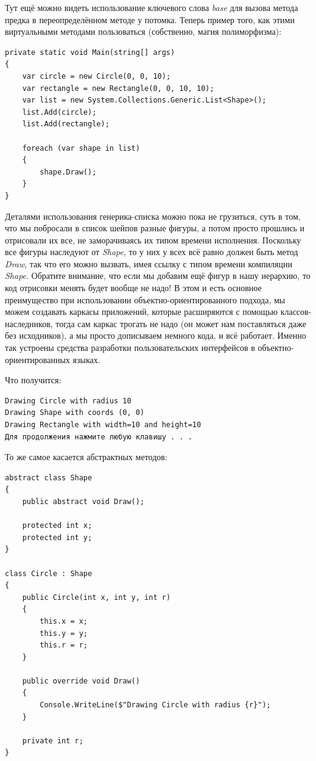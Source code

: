 \documentclass[a5paper]{article}
\begin{document}
Тут ещё можно видеть использование ключевого слова \textit{base} для вызова метода предка в переопределённом методе у потомка. Теперь пример того, как этими виртуальными методами пользоваться (собственно, магия полиморфизма):

\begin{verbatim}
private static void Main(string[] args)
{
    var circle = new Circle(0, 0, 10);
    var rectangle = new Rectangle(0, 0, 10, 10);
    var list = new System.Collections.Generic.List<Shape>();
    list.Add(circle);
    list.Add(rectangle);

    foreach (var shape in list)
    {
        shape.Draw();
    }
}
\end{verbatim}

Деталями использования генерика-списка можно пока не грузиться, суть в том, что мы побросали в список шейпов разные фигуры, а потом просто прошлись и отрисовали их все, не заморачиваясь их типом времени исполнения. Поскольку все фигуры наследуют от \textit{Shape}, то у них у всех всё равно должен быть метод \textit{Draw}, так что его можно вызвать, имея ссылку с типом времени компиляции \textit{Shape}. Обратите внимание, что если мы добавим ещё фигур в нашу иерархию, то код отрисовки менять будет вообще не надо! В этом и есть основное преимущество при использовании объектно-ориентированного подхода, мы можем создавать каркасы приложений, которые расширяются с помощью классов-наследников, тогда сам каркас трогать не надо (он может нам поставляться даже без исходников), а мы просто дописываем немного кода, и всё работает. Именно так устроены средства разработки пользовательских интерфейсов в объектно-ориентированных языках.

Что получится:

\begin{verbatim}
Drawing Circle with radius 10
Drawing Shape with coords (0, 0)
Drawing Rectangle with width=10 and height=10
Для продолжения нажмите любую клавишу . . .
\end{verbatim}

То же самое касается абстрактных методов:

\begin{verbatim}
abstract class Shape
{
    public abstract void Draw();

    protected int x;
    protected int y;
}

class Circle : Shape
{
    public Circle(int x, int y, int r)
    {
        this.x = x;
        this.y = y;
        this.r = r;
    }

    public override void Draw()
    {
        Console.WriteLine($"Drawing Circle with radius {r}");
    }

    private int r;
}
\end{verbatim}
\end{document}
